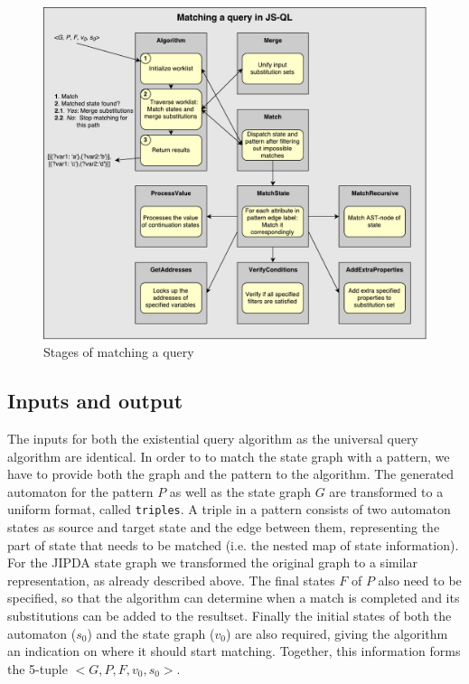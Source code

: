 \begin{figure}[!h]
    \centering
      \includegraphics[width=1\textwidth]{images/matchingEngine} 
      \caption{Stages of matching a query}
    \label{fig:matchingEngine}
\end{figure}

\subsection{Inputs and output}
\label{subsec:inputOutput}
The inputs for both the existential query algorithm as the universal query algorithm are identical. In order to to match the state graph with a pattern, we have to provide both the graph and the pattern to the algorithm. The generated automaton for the pattern $P$ as well as the state graph $G$ are transformed to a uniform format, called \texttt{triples}. A triple in a pattern consists of two automaton states as source and target state and the edge between them, representing the part of state that needs to be matched (i.e. the nested map of state information). For the JIPDA state graph we transformed the original graph to a similar representation, as already described above. The final states $F$ of $P$ also need to be specified, so that the algorithm can determine when a match is completed and its substitutions can be added to the resultset. Finally the initial states of both the automaton ($s_0$) and the state graph ($v_0$) are also required, giving the algorithm an indication on where it should start matching. Together, this information forms the 5-tuple $<G, P, F, v_0, s_0>$.


